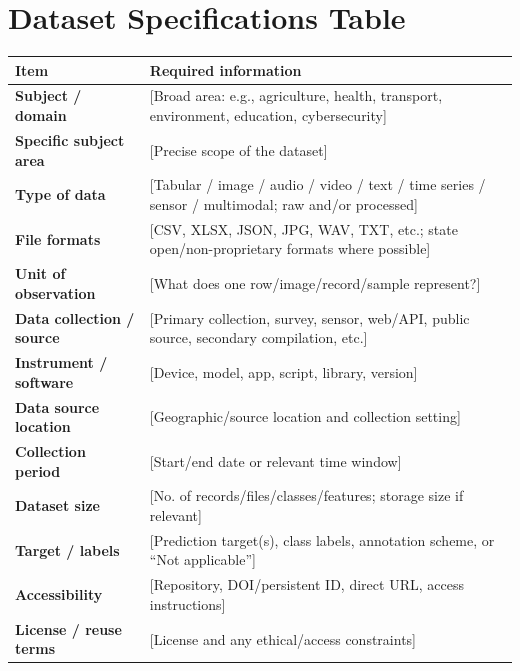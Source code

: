 \documentclass[11pt,a4paper]{article}
\begin{document}
\section{Dataset Specifications Table}
\noindent
\begin{tabularx}{\textwidth}{|p{4.2cm}|X|}
\hline
\textbf{Item} & \textbf{Required information} \\
\hline
\textbf{Subject / domain} & [Broad area: e.g., agriculture, health, transport, environment, education, cybersecurity] \\
\hline
\textbf{Specific subject area} & [Precise scope of the dataset] \\
\hline
\textbf{Type of data} & [Tabular / image / audio / video / text / time series / sensor / multimodal; raw and/or processed] \\
\hline
\textbf{File formats} & [CSV, XLSX, JSON, JPG, WAV, TXT, etc.; state open/non-proprietary formats where possible] \\
\hline
\textbf{Unit of observation} & [What does one row/image/record/sample represent?] \\
\hline
\textbf{Data collection / source} & [Primary collection, survey, sensor, web/API, public source, secondary compilation, etc.] \\
\hline
\textbf{Instrument / software} & [Device, model, app, script, library, version] \\
\hline
\textbf{Data source location} & [Geographic/source location and collection setting] \\
\hline
\textbf{Collection period} & [Start/end date or relevant time window] \\
\hline
\textbf{Dataset size} & [No. of records/files/classes/features; storage size if relevant] \\
\hline
\textbf{Target / labels} & [Prediction target(s), class labels, annotation scheme, or “Not applicable”] \\
\hline
\textbf{Accessibility} & [Repository, DOI/persistent ID, direct URL, access instructions] \\
\hline
\textbf{License / reuse terms} & [License and any ethical/access constraints] \\
\hline
\end{tabularx}

\vspace{1.5em}

\end{document}
